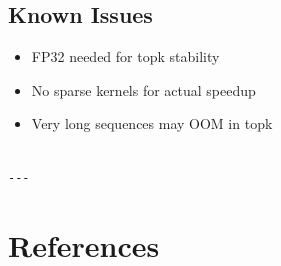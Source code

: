 \subsection{Known Issues}

\begin{itemize}
\item FP32 needed for topk stability
\item No sparse kernels for actual speedup
\item Very long sequences may OOM in topk
\end{itemize}
\begin{lstlisting}

---
\end{lstlisting}


\section{References}

